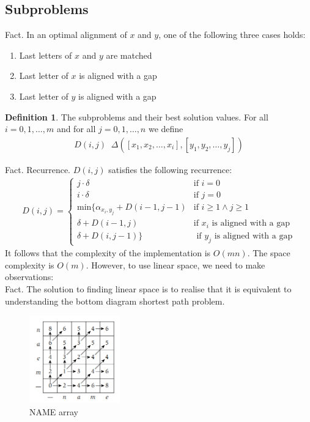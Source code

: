 \documentclass[a4paper]{article}
\theoremstyle{plain}
\newcommand*{\MyDef}{\mathrm{def}}
\newcommand*{\eqdef}{\ensuremath{\mathop{\overset{\MyDef}{=}}}}
\theoremstyle{definition}
\newtheorem{defn}{Definition}[section]
\theoremstyle{remark}
\begin{document}
		\subsection{Subproblems}
		Fact. In an optimal alignment of $x$ and $y$, one of the following three cases holds:
		\begin{enumerate}
			\item Last letters of $x$ and $y$ are matched
			\item Last letter of $x$ is aligned with a gap
			\item Last letter of $y$ is aligned with a gap
		\end{enumerate}
		\begin{defn}
			The subproblems and their best solution values. For all $i=0,1,\ldots,m$ and for all $j=0,1,\ldots,n$ we define
			\begin{align*}
				D(i,j) \eqdef \Delta([x_1,x_2,\ldots,x_i],[y_1,y_2,\ldots,y_j])
			\end{align*}
		\end{defn}
		Fact. Recurrence. $D(i,j)$ satisfies the following recurrence:
		\begin{align*}
			D(i,j) = \begin{cases}
				j \cdot \delta& \text{if }i=0 \\
				i \cdot \delta & \text{if }j=0 \\
				\text{min}\{\alpha_{x_i,y_j}+D(i-1,j-1) &\text{if }i \ge 1 \land j\ge 1 \\
				\delta + D(i-1,j) & \text{if $x_i$ is aligned with a gap} \\
				\delta + D(i,j-1)\} & \text{ if $y_j$ is aligned with a gap}
			\end{cases}
	\end{align*}
	It follows that the complexity of the implementation is $O(mn)$. The space complexity is $O(m)$. However, to use linear space, we need to make observations: \\
	Fact. The solution to finding linear space is to realise that it is equivalent to understanding the bottom diagram shortest path problem.
	\begin{figure}[H]
		\centering
		\includegraphics[width=0.35\textwidth]{diagram.png}
		\caption{NAME array}
		\label{fig:diagram-png}
	\end{figure}
\end{document}
